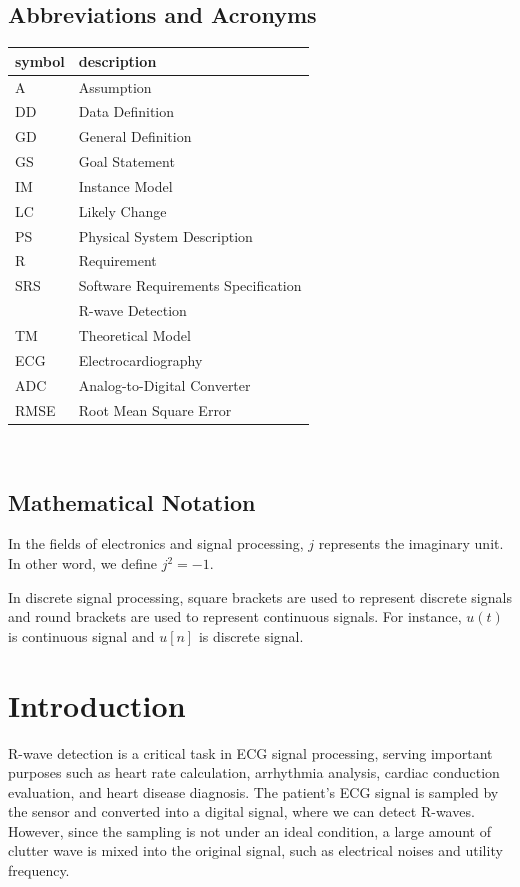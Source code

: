 \documentclass[12pt]{article}
\begin{document}
\subsection{Abbreviations and Acronyms}

\renewcommand{\arraystretch}{1.2}
\begin{tabular}{l l} 
  \toprule		
  \textbf{symbol} & \textbf{description}\\
  \midrule 
  A & Assumption\\
  DD & Data Definition\\
  GD & General Definition\\
  GS & Goal Statement\\
  IM & Instance Model\\
  LC & Likely Change\\
  PS & Physical System Description\\
  R & Requirement\\
  SRS & Software Requirements Specification\\
  \progname{} & R-wave Detection\\
  TM & Theoretical Model\\
  ECG & Electrocardiography\\
  ADC & Analog-to-Digital Converter \\
  RMSE & Root Mean Square Error\\
  \bottomrule
\end{tabular}\\

\subsection{Mathematical Notation}

In the fields of electronics and signal processing, $j$ represents the imaginary
unit. In other word, we define $j^2 = -1$.

In discrete signal processing, square brackets are used to represent discrete
signals and round brackets are used to represent continuous signals.  For
instance, $u(t)$ is continuous signal and $u[n]$ is discrete signal.

\newpage


\section{Introduction}

R-wave detection is a critical task in ECG signal processing, serving important
purposes such as heart rate calculation, arrhythmia analysis, cardiac conduction
evaluation, and heart disease diagnosis.  The patient's ECG signal is sampled by
the sensor and converted into a digital signal, where we can detect R-waves.
However, since the sampling is not under an ideal condition, a large amount of
clutter wave is mixed into the original signal, such as electrical noises and
utility frequency.
\end{document}
